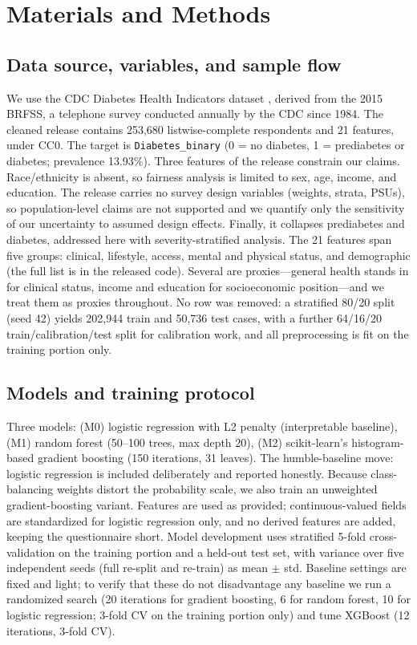 \documentclass[conference]{IEEEtran}
\begin{document}
\section{Materials and Methods}

\subsection{Data source, variables, and sample flow}
We use the CDC Diabetes Health Indicators dataset \cite{cdc2017}, derived from the 2015 BRFSS, a telephone survey conducted annually by the CDC since 1984. The cleaned release contains 253{,}680 listwise-complete respondents and 21 features, under CC0. The target is \texttt{Diabetes\_binary} (0 = no diabetes, 1 = prediabetes or diabetes; prevalence 13.93\%). Three features of the release constrain our claims. Race/ethnicity is absent, so fairness analysis is limited to sex, age, income, and education. The release carries no survey design variables (weights, strata, PSUs), so population-level claims are not supported and we quantify only the sensitivity of our uncertainty to assumed design effects. Finally, it collapses prediabetes and diabetes, addressed here with severity-stratified analysis. The 21 features span five groups: clinical, lifestyle, access, mental and physical status, and demographic (the full list is in the released code). Several are proxies---general health stands in for clinical status, income and education for socioeconomic position---and we treat them as proxies throughout. No row was removed: a stratified 80/20 split (seed 42) yields 202{,}944 train and 50{,}736 test cases, with a further 64/16/20 train/calibration/test split for calibration work, and all preprocessing is fit on the training portion only.

\subsection{Models and training protocol}
Three models: (M0) logistic regression with L2 penalty (interpretable baseline), (M1) random forest (50--100 trees, max depth 20), (M2) scikit-learn's histogram-based gradient boosting (150 iterations, 31 leaves). The humble-baseline move: logistic regression is included deliberately and reported honestly. Because class-balancing weights distort the probability scale, we also train an unweighted gradient-boosting variant. Features are used as provided; continuous-valued fields are standardized for logistic regression only, and no derived features are added, keeping the questionnaire short. Model development uses stratified 5-fold cross-validation on the training portion and a held-out test set, with variance over five independent seeds (full re-split and re-train) as mean $\pm$ std. Baseline settings are fixed and light; to verify that these do not disadvantage any baseline we run a randomized search (20 iterations for gradient boosting, 6 for random forest, 10 for logistic regression; 3-fold CV on the training portion only) and tune XGBoost \cite{xgboost} (12 iterations, 3-fold CV).
\end{document}
